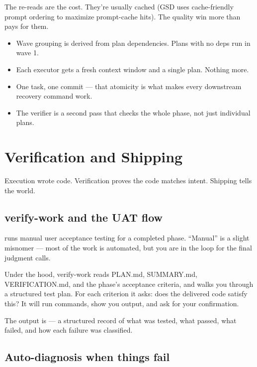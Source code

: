 \documentclass[11pt,letterpaper,openany]{book}
\begin{document}
The re-reads are the cost. They're usually cached (GSD uses cache-friendly prompt ordering to maximize prompt-cache hits). The quality win more than pays for them.

\begin{gsdnote}[title=Key Takeaways]
\begin{itemize}[itemsep=2pt,leftmargin=1.2em]
  \item Wave grouping is derived from plan dependencies. Plans with no deps run in wave 1.
  \item Each executor gets a fresh context window and a single plan. Nothing more.
  \item One task, one commit --- that atomicity is what makes every downstream recovery command work.
  \item The verifier is a second pass that checks the whole phase, not just individual plans.
\end{itemize}
\end{gsdnote}

\chapter{Verification and Shipping}

Execution wrote code. Verification proves the code matches intent. Shipping tells the world.

\section{verify-work and the UAT flow}

 runs manual user acceptance testing for a completed phase. ``Manual'' is a slight misnomer --- most of the work is automated, but you are in the loop for the final judgment calls.

Under the hood, verify-work reads PLAN.md, SUMMARY.md, VERIFICATION.md, and the phase's acceptance criteria, and walks you through a structured test plan. For each criterion it asks: does the delivered code satisfy this? It will run commands, show you output, and ask for your confirmation.

The output is  --- a structured record of what was tested, what passed, what failed, and how each failure was classified.

\section{Auto-diagnosis when things fail}
\end{document}
